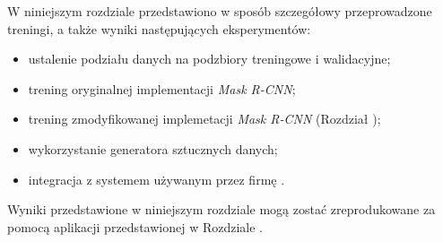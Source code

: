 
W niniejszym rozdziale przedstawiono w sposób szczegółowy przeprowadzone treningi, a także wyniki następujących eksperymentów:

\begin{itemize}
 \item ustalenie podziału danych na podzbiory treningowe i walidacyjne;
 \item trening oryginalnej implementacji \textit{Mask R-CNN};
 \item trening zmodyfikowanej implemetacji \textit{Mask R-CNN} (Rozdział );
 \item wykorzystanie generatora sztucznych danych;
 \item integracja z systemem używanym przez firmę \blue{}.
\end{itemize}

Wyniki przedstawione w niniejszym rozdziale mogą zostać zreprodukowane za pomocą aplikacji przedstawionej w Rozdziale .
